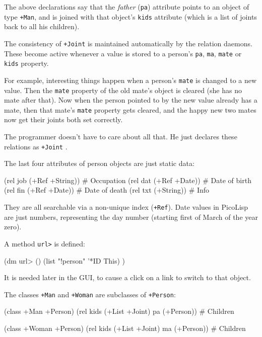 The above declarations say that the \emph{father} (\texttt{pa}) attribute points to
an object of type \texttt{+Man}, and is joined with that object's \texttt{kids}
attribute (which is a list of joints back to all his children).

The consistency of \texttt{+Joint}  is maintained automatically by the relation
daemons. These become active whenever a value is stored to a person's
\texttt{pa}, \texttt{ma}, \texttt{mate} or \texttt{kids} property.

For example, interesting things happen when a person's \texttt{mate} is changed
to a new value. Then the \texttt{mate} property of the old mate's object is
cleared (she has no mate after that). Now when the person pointed to by
the new value already has a mate, then that mate's \texttt{mate} property gets
cleared, and the happy new two mates now get their joints both set
correctly.

The programmer doesn't have to care about all that. He just declares
these relations as \texttt{+Joint} .

The last four attributes of person objects are just static data:


\begin{wideverbatim}
(rel job (+Ref +String))               # Occupation
(rel dat (+Ref +Date))                 # Date of birth
(rel fin (+Ref +Date))                 # Date of death
(rel txt (+String))                    # Info
\end{wideverbatim}

They are all searchable via a non-unique index (\texttt{+Ref}). Date values in
PicoLisp are just numbers, representing the day number (starting first
of March of the year zero).

A method \texttt{url>} is defined:


\begin{wideverbatim}
(dm url> ()
   (list "!person" '*ID This) )
\end{wideverbatim}

It is needed later in the GUI, to cause a click on a link to switch to
that object.

The classes \texttt{+Man} and \texttt{+Woman} are subclasses of \texttt{+Person}:


\begin{wideverbatim}
(class +Man +Person)
(rel kids (+List +Joint) pa (+Person)) # Children

(class +Woman +Person)
(rel kids (+List +Joint) ma (+Person)) # Children
\end{wideverbatim}

